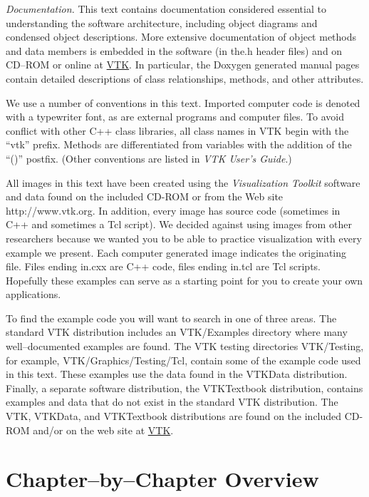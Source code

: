 \emph{Documentation.} This text contains documentation considered essential to understanding the software architecture, including object diagrams and condensed object descriptions. More extensive documentation of object methods and data members is embedded in the software (in the.h header files) and on CD--ROM or online at \href{https://www.vtk.org/}{VTK}. In particular, the Doxygen generated manual pages contain detailed descriptions of class relationships, methods, and other attributes.

We use a number of conventions in this text. Imported computer code is denoted with a typewriter font, as are external programs and computer files. To avoid conflict with other C++ class libraries, all class names in VTK begin with the ``vtk'' prefix. Methods are differentiated from variables with the addition of the ``()'' postfix. (Other conventions are listed in \emph{VTK User's Guide}.)

All images in this text have been created using the \emph{Visualization Toolkit} software and data found on the included CD-ROM or from the Web site http://www.vtk.org. In addition, every image has source code (sometimes in C++ and sometimes a Tcl script). We decided against using images from other researchers because we wanted you to be able to practice visualization with every example we present. Each computer generated image indicates the originating file. Files ending in.cxx are C++ code, files ending in.tcl are Tcl scripts. Hopefully these examples can serve as a starting point for you to create your own applications.

To find the example code you will want to search in one of three areas. The standard VTK distribution includes an VTK/Examples directory where many well--documented examples are found. The VTK testing directories VTK/Testing, for example, VTK/Graphics/Testing/Tcl, contain some of the example code used in this text. These examples use the data found in the VTKData distribution. Finally, a separate software distribution, the VTKTextbook distribution, contains examples and data that do not exist in the standard VTK distribution. The VTK, VTKData, and VTKTextbook distributions are found on the included CD-ROM and/or on the web site at \href{https://www.vtk.org/}{VTK}.

\section{Chapter--by--Chapter Overview}

